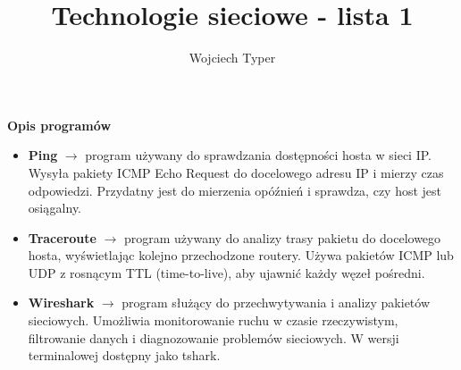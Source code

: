 \documentclass[12pt]{article}
\title{Technologie sieciowe - lista 1}
\author{Wojciech Typer}
\date{}
\begin{document}
\maketitle

\vspace{1\baselineskip}

\textbf{Opis programów}
\begin{itemize}
  \item \textbf{Ping} $\rightarrow$ program używany do sprawdzania dostępności hosta w sieci IP.
  Wysyła pakiety ICMP Echo Request do docelowego adresu IP i mierzy czas odpowiedzi.
  Przydatny jest do mierzenia opóźnień i sprawdza, czy host jest osiągalny.
  \item \textbf{Traceroute} $\rightarrow$ program używany do analizy trasy pakietu do docelowego hosta,
  wyświetlając kolejno przechodzone routery. Używa pakietów ICMP lub UDP z rosnącym TTL (time-to-live),
  aby ujawnić każdy węzeł pośredni.
  \item \textbf{Wireshark} $\rightarrow$ program służący do przechwytywania i analizy pakietów sieciowych.
  Umożliwia monitorowanie ruchu w czasie rzeczywistym, filtrowanie danych i diagnozowanie problemów
  sieciowych. W wersji terminalowej dostępny jako tshark.
\end{itemize}
\end{document}
